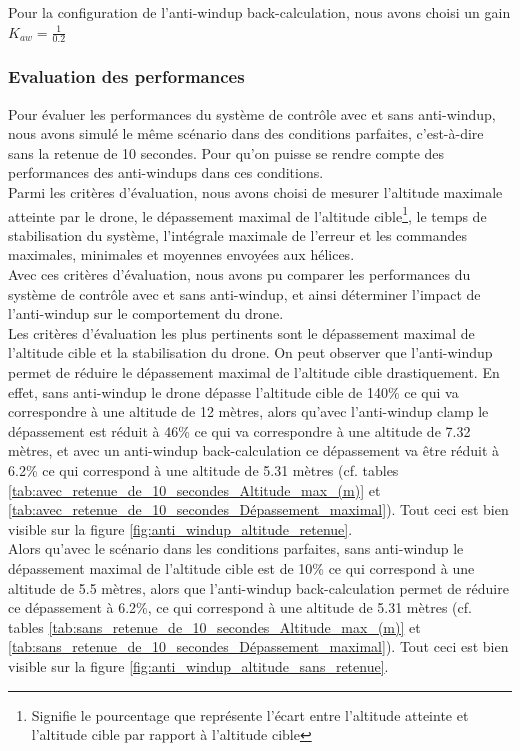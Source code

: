 Pour la configuration de l'anti-windup back-calculation, nous avons choisi un gain $K_{aw} = \frac{1}{0.2}$

\subsubsection{Evaluation des performances}
\label{sec:evaluation_perf_anti_windup}

Pour évaluer les performances du système de contrôle avec et sans anti-windup, nous avons simulé le même scénario dans des conditions parfaites, c'est-à-dire sans la retenue de 10 secondes. Pour qu'on puisse se rendre compte des performances des anti-windups dans ces conditions. \\

Parmi les critères d'évaluation, nous avons choisi de mesurer l'altitude maximale atteinte par le drone, le dépassement maximal de l'altitude cible\footnote{Signifie le pourcentage que représente l'écart entre l'altitude atteinte et l'altitude cible par rapport à l'altitude cible}, le temps de stabilisation du système, l'intégrale maximale de l'erreur et les commandes maximales, minimales et moyennes envoyées aux hélices. \\

Avec ces critères d'évaluation, nous avons pu comparer les performances du système de contrôle avec et sans anti-windup, et ainsi déterminer l'impact de l'anti-windup sur le comportement du drone. \\

Les critères d'évaluation les plus pertinents sont le dépassement maximal de l'altitude cible et la stabilisation du drone. On peut observer que l'anti-windup permet de réduire le dépassement maximal de l'altitude cible drastiquement. En effet, sans anti-windup le drone dépasse l'altitude cible de 140\% ce qui va correspondre à une altitude de 12 mètres, alors qu'avec l'anti-windup clamp le dépassement est réduit à 46\% ce qui va correspondre à une altitude de 7.32 mètres, et avec un anti-windup back-calculation ce dépassement va être réduit à 6.2\% ce qui correspond à une altitude de 5.31 mètres (cf. tables \ref{tab:avec_retenue_de_10_secondes_Altitude_max_(m)} et \ref{tab:avec_retenue_de_10_secondes_Dépassement_maximal}). Tout ceci est bien visible sur la figure \ref{fig:anti_windup_altitude_retenue}. \\

Alors qu'avec le scénario dans les conditions parfaites, sans anti-windup le dépassement maximal de l'altitude cible est de 10\% ce qui correspond à une altitude de 5.5 mètres, alors que l'anti-windup back-calculation permet de réduire ce dépassement à 6.2\%, ce qui correspond à une altitude de 5.31 mètres (cf. tables \ref{tab:sans_retenue_de_10_secondes_Altitude_max_(m)} et \ref{tab:sans_retenue_de_10_secondes_Dépassement_maximal}). Tout ceci est bien visible sur la figure \ref{fig:anti_windup_altitude_sans_retenue}. \\

